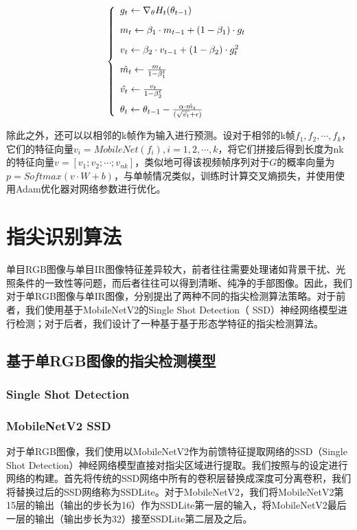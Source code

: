 \begin{equation}
\label{adam}
\left\{\begin{array}{l}
    g_t \leftarrow \nabla_\theta H_t(\theta_{t-1})\\[0.3cm]
    m_t \leftarrow \beta_1 \cdot m_{t-1} + (1-\beta_1) \cdot g_t\\[0.3cm]
    v_t \leftarrow \beta_2 \cdot v_{t-1} + (1-\beta_2) \cdot g_t^2\\[0.3cm]
    \hat{m_t} \leftarrow {m_t \over {1- \beta_1^t}}\\[0.3cm]
    \hat{v_t} \leftarrow {v_t \over {1- \beta_2^t}}\\[0.3cm]
    \theta_t \leftarrow \theta_{t-1} - {\alpha \cdot {\hat{m_t}} \over {(\sqrt{\hat{v_t}} + \epsilon)}}
\end{array}\right.
\end{equation}

除此之外，还可以以相邻的k帧作为输入进行预测。设对于相邻的k帧$f_1,f_2,\cdots,f_k$，它们的特征向量$v_i=MobileNet(f_i),i=1,2,\cdots,k$，将它们拼接后得到长度为nk的特征向量$v=[v_1;v_2;\cdots;v_{nk}]$，类似地可得该视频帧序列对于$G$的概率向量为$p = Softmax(v \cdot W + b)$，与单帧情况类似，训练时计算交叉熵损失，并使用使用Adam优化器对网络参数进行优化。

\section{指尖识别算法}
\label{cha:fingertip}
单目RGB图像与单目IR图像特征差异较大，前者往往需要处理诸如背景干扰、光照条件的一致性等问题，而后者往往可以得到清晰、纯净的手部图像。因此，我们对于单RGB图像与单IR图像，分别提出了两种不同的指尖检测算法策略。对于前者，我们使用基于MobileNetV2的Single Shot Detection（
SSD）神经网络模型进行检测；对于后者，我们设计了一种基于基于形态学特征的指尖检测算法。

\subsection{基于单RGB图像的指尖检测模型}

\subsubsection{Single Shot Detection}

\subsubsection{MobileNetV2 SSD}
对于单RGB图像，我们使用以MobileNetV2作为前馈特征提取网络的SSD（Single Shot Detection）神经网络模型直接对指尖区域进行提取。我们按照与的设定进行网络的构建。首先将传统的SSD网络中所有的卷积层替换成深度可分离卷积，我们将替换过后的SSD网络称为SSDLite。对于MobileNetV2，我们将MobileNetV2第15层的输出（输出的步长为16）作为SSDLite第一层的输入，将MobileNetV2最后一层的输出（输出步长为32）接至SSDLite第二层及之后。


